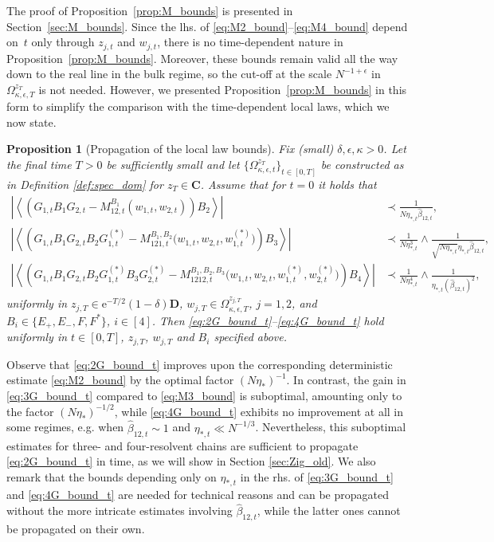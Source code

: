 \documentclass[10pt]{amsart}
\newtheorem{proposition}[theorem]{Proposition}
\numberwithin{equation}{section}
\newcommand{\C}{\mathbf{C}}
\newcommand{\ee}{\mathrm{e}}
\begin{document}
The proof of Proposition~\ref{prop:M_bounds} is presented in Section~\ref{sec:M_bounds}. Since the lhs. of \eqref{eq:M2_bound}--\eqref{eq:M4_bound} depend on~$t$ only through $z_{j,t}$ and $w_{j,t}$, there is no time-dependent nature in Proposition~\ref{prop:M_bounds}. Moreover, these bounds remain valid all the way down to the real line in the bulk regime, so the cut-off at the scale $N^{-1+\epsilon}$ in $\Omega_{\kappa,\epsilon,T}^{z_T}$ is not needed. However, we presented Proposition~\ref{prop:M_bounds} in this form to simplify the comparison with the time-dependent local laws, which we now state.


\begin{proposition}[Propagation of the local law bounds]\label{prop:Zig} Fix (small) $\delta, \epsilon, \kappa>0$. Let the final time $T>0$ be sufficiently small and let $\{\Omega_{\kappa,\epsilon,t}^{z_T}\}_{t\in [0,T]}$ be constructed as in Definition \ref{def:spec_dom} for $z_{T}\in \C$. Assume that for $t=0$ it holds that
\begin{align}
\left\vert\left\langle \left(G_{1,t}B_1G_{2,t}-M_{12,t}^{B_1}(w_{1,t},w_{2,t})\right)B_2\right\rangle\right\vert &\prec  \frac{1}{N\eta_{*,t}\widehat{\beta}_{12,t}},\label{eq:2G_bound_t}\\
\left\vert\left\langle \left(G_{1,t}B_1G_{2,t}B_2G_{1,t}^{(*)}-M_{121,t}^{B_1,B_2}\big(w_{1,t},w_{2,t},w_{1,t}^{(*)}\big)\right) B_3\right\rangle\right\vert &\prec \frac{1}{N\eta_{*,t}^3}\wedge\frac{1}{\sqrt{N\eta_{*,t}}\eta_{*,t}\widehat{\beta}_{12,t}},\label{eq:3G_bound_t}\\
\left\vert\left\langle \left(G_{1,t}B_1G_{2,t}B_2G_{1,t}^{(*)}B_3G_{2,t}^{(*)}-M_{1212,t}^{B_1,B_2,B_3}\big(w_{1,t},w_{2,t},w_{1,t}^{(*)}, w_{2,t}^{(*)}\big)\right) B_4\right\rangle\right\vert &\prec \frac{1}{N\eta_{*,t}^4}\wedge\frac{1}{\eta_{*,t}(\widehat{\beta}_{12,t})^2},\label{eq:4G_bound_t}
\end{align}
uniformly in $z_{j,T}\in \ee^{-T/2}(1-\delta)\mathbf{D}$, $w_{j,T}\in\Omega^{z_{j,T}}_{\kappa,\epsilon,T}$, $j=1,2$, and $B_i\in\{E_+,E_-,F,F^*\}$, $i\in [4]$. Then \eqref{eq:2G_bound_t}--\eqref{eq:4G_bound_t} hold uniformly in $t\in [0,T]$, $z_{j,T}$, $w_{j,T}$ and $B_i$ specified above.
\end{proposition}


Observe that \eqref{eq:2G_bound_t} improves upon the corresponding deterministic estimate \eqref{eq:M2_bound} by the optimal factor $(N\eta_*)^{-1}$. In contrast, the gain in \eqref{eq:3G_bound_t} compared to \eqref{eq:M3_bound} is suboptimal, amounting only to the factor $(N\eta_*)^{-1/2}$, while \eqref{eq:4G_bound_t} exhibits no improvement at all in some regimes, e.g. when $\widehat{\beta}_{12,t}\sim 1$ and $\eta_{*,t}\ll N^{-1/3}$. Nevertheless, this suboptimal estimates for three- and four-resolvent chains are sufficient to propagate \eqref{eq:2G_bound_t} in time, as we will show in Section \ref{sec:Zig_old}. We also remark that the bounds depending only on $\eta_{*,t}$ in the rhs. of \eqref{eq:3G_bound_t} and \eqref{eq:4G_bound_t} are needed for technical reasons and can be propagated without the more intricate estimates involving $\widehat{\beta}_{12,t}$, while the latter ones cannot be propagated on their own.
\end{document}
